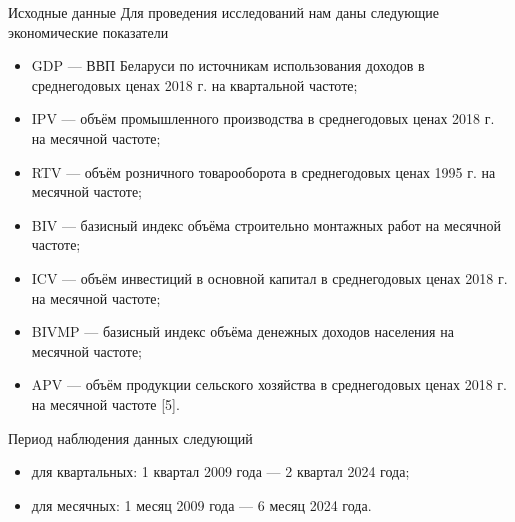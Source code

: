 \documentclass[notheorems, 10pt]{beamer}
\begin{document}
\begin{frame}
	{Исходные данные}
	Для проведения исследований нам даны следующие экономические показатели
	\begin{itemize}
		\item GDP — ВВП Беларуси по источникам использования доходов в среднегодовых ценах 2018 г. на квартальной частоте;
		\item IPV — объём промышленного производства в среднегодовых ценах 2018
		г. на месячной частоте;
		\item RTV — объём розничного товарооборота в среднегодовых ценах 1995 г.
		на месячной частоте;
		\item BIV — базисный индекс объёма строительно монтажных работ на месячной частоте;
		\item ICV — объём инвестиций в основной капитал в среднегодовых ценах 2018
		г. на месячной частоте;
		\item BIVMP — базисный индекс объёма денежных доходов населения на месячной частоте;
		\item APV — объём продукции сельского хозяйства в среднегодовых ценах 2018
		г. на месячной частоте [5].
	\end{itemize}
	
	Период наблюдения данных следующий
	\begin{itemize}
		\item для квартальных: 1 квартал 2009 года — 2 квартал 2024 года;
		\item для месячных: 1 месяц 2009 года — 6 месяц 2024 года.
	\end{itemize}
\end{frame}
\end{document}
